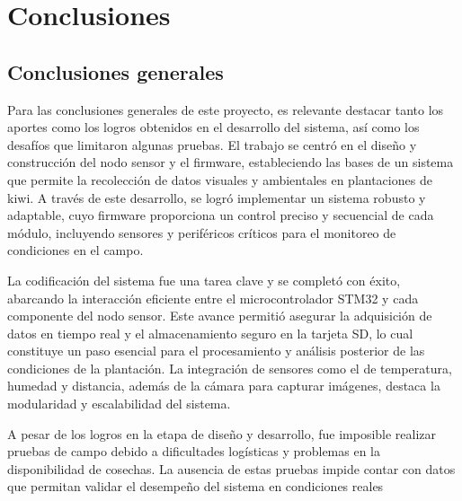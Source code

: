 
\chapter{Conclusiones} %

\label{Chapter5} %




\section{Conclusiones generales }

Para las conclusiones generales de este proyecto, es relevante destacar tanto los aportes como los logros obtenidos en el desarrollo del sistema, así como los desafíos que limitaron algunas pruebas. El trabajo se centró en el diseño y construcción del nodo sensor y el firmware, estableciendo las bases de un sistema que permite la recolección de datos visuales y ambientales en plantaciones de kiwi. A través de este desarrollo, se logró implementar un sistema robusto y adaptable, cuyo firmware proporciona un control preciso y secuencial de cada módulo, incluyendo sensores y periféricos críticos para el monitoreo de condiciones en el campo.

La codificación del sistema fue una tarea clave y se completó con éxito, abarcando la interacción eficiente entre el microcontrolador STM32 y cada componente del nodo sensor. Este avance permitió asegurar la adquisición de datos en tiempo real y el almacenamiento seguro en la tarjeta SD, lo cual constituye un paso esencial para el procesamiento y análisis posterior de las condiciones de la plantación. La integración de sensores como el de temperatura, humedad y distancia, además de la cámara para capturar imágenes, destaca la modularidad y escalabilidad del sistema. 

A pesar de los logros en la etapa de diseño y desarrollo, fue imposible realizar pruebas de campo debido a dificultades logísticas y problemas en la disponibilidad de cosechas. La ausencia de estas pruebas impide contar con datos que permitan validar el desempeño del sistema en condiciones reales

